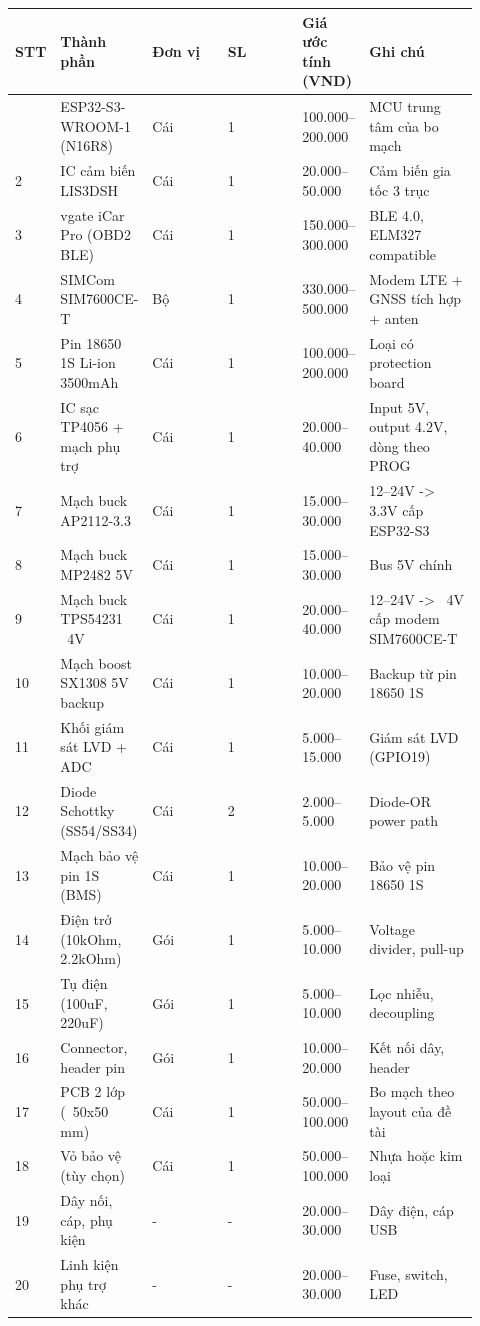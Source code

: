 \documentclass[13pt,a4paper]{extarticle}
\newcounter{none} %
\newcommand{\thesislongtableorignewline}{}
\let\thesislongtableorignewline\\
\renewcommand{\\}{\thesislongtableorignewline\hline}%
\let\\\thesislongtableorignewline
\begin{document}
{\def\LTcaptype{none} %
\begin{longtable}{|p{0.06\linewidth}|p{0.14\linewidth}|p{0.17\linewidth}|p{0.17\linewidth}|p{0.14\linewidth}|p{0.24\linewidth}|}
\hline \textbf{STT} & \textbf{Thành phần} & \textbf{Đơn vị} & \textbf{SL} & \textbf{Giá ước tính (VND)} & \textbf{Ghi chú} \\
\hline
\endhead
\hline
\endlastfoot
1 & ESP32-S3-WROOM-1 (N16R8) & Cái & 1 & 100.000--200.000 & MCU trung
tâm của bo mạch \\
2 & IC cảm biến LIS3DSH & Cái & 1 & 20.000--50.000 & Cảm biến gia tốc 3
trục \\
3 & vgate iCar Pro (OBD2 BLE) & Cái & 1 & 150.000--300.000 & BLE 4.0,
ELM327 compatible \\
4 & SIMCom SIM7600CE-T & Bộ & 1 & 330.000--500.000 & Modem LTE + GNSS
tích hợp + anten \\
5 & Pin 18650 1S Li-ion 3500mAh & Cái & 1 & 100.000--200.000 & Loại có
protection board \\
6 & IC sạc TP4056 + mạch phụ trợ & Cái & 1 & 20.000--40.000 & Input 5V,
output 4.2V, dòng theo PROG \\
7 & Mạch buck AP2112-3.3 & Cái & 1 & 15.000--30.000 & 12--24V
-\textgreater{} 3.3V cấp ESP32-S3 \\
8 & Mạch buck MP2482 5V & Cái & 1 & 15.000--30.000 & Bus 5V chính \\
9 & Mạch buck TPS54231 ~4V & Cái & 1 & 20.000--40.000 &
12--24V -\textgreater{} ~4V cấp modem SIM7600CE-T \\
10 & Mạch boost SX1308 5V backup & Cái & 1 & 10.000--20.000 & Backup từ
pin 18650 1S \\
11 & Khối giám sát LVD + ADC & Cái & 1 & 5.000--15.000 & Giám sát LVD
(GPIO19) \\
12 & Diode Schottky (SS54/SS34) & Cái & 2 & 2.000--5.000 & Diode-OR power
path \\
13 & Mạch bảo vệ pin 1S (BMS) & Cái & 1 & 10.000--20.000 & Bảo vệ pin
18650 1S \\
14 & Điện trở (10kOhm, 2.2kOhm) & Gói & 1 & 5.000--10.000 & Voltage
divider, pull-up \\
15 & Tụ điện (100uF, 220uF) & Gói & 1 & 5.000--10.000 & Lọc nhiễu,
decoupling \\
16 & Connector, header pin & Gói & 1 & 10.000--20.000 & Kết nối dây,
header \\
17 & PCB 2 lớp (~50x50 mm) & Cái & 1 & 50.000--100.000 &
Bo mạch theo layout của đề tài \\
18 & Vỏ bảo vệ (tùy chọn) & Cái & 1 & 50.000--100.000 & Nhựa hoặc kim
loại \\
19 & Dây nối, cáp, phụ kiện & - & - & 20.000--30.000 & Dây điện, cáp
USB \\
20 & Linh kiện phụ trợ khác & - & - & 20.000--30.000 & Fuse, switch,
LED \\
\end{longtable}
}
\end{document}
